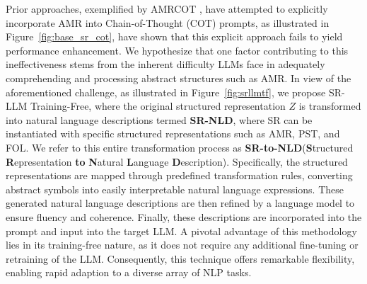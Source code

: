 Prior approaches, exemplified by AMRCOT \cite{jin2024analyzing}, have attempted to explicitly incorporate AMR into Chain-of-Thought (COT) prompts, as illustrated in Figure~\ref{fig:base_sr_cot}, have shown that this explicit approach fails to yield performance enhancement. We hypothesize that one factor contributing to this ineffectiveness stems from the inherent difficulty LLMs face in adequately comprehending and processing abstract structures such as AMR. In view of the aforementioned challenge, as illustrated in Figure~\ref{fig:srllmtf}, we propose SR-LLM Training-Free, where the original structured representation $Z$ is transformed into natural language descriptions termed \textbf{SR-NLD}, where SR can be instantiated with specific structured representations such as AMR, PST, and FOL. We refer to this entire transformation process as \textbf{SR-to-NLD}(\textbf{S}tructured \textbf{R}epresentation \textbf{to} \textbf{N}atural \textbf{L}anguage \textbf{D}escription). Specifically, the structured representations are mapped through predefined transformation rules, converting abstract symbols into easily interpretable natural language expressions. These generated natural language descriptions are then refined by a language model to ensure fluency and coherence. Finally, these descriptions are incorporated into the prompt and input into the target LLM. A pivotal advantage of this methodology lies in its training-free nature, as it does not require any additional fine-tuning or retraining of the LLM. Consequently, this technique offers remarkable flexibility, enabling rapid adaption to a diverse array of NLP tasks. 

